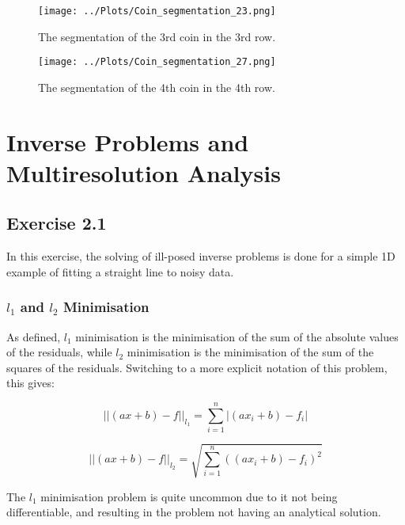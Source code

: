 \documentclass[12pt]{report} %
\begin{document}
\begin{figure}[htbp]
    \centering
    \texttt{[image: ../Plots/Coin\_segmentation\_23.png]}
    \caption{The segmentation of the 3rd coin in the 3rd row.}
    \label{fig:coin_23_segmentation}
\end{figure}

\begin{figure}[htbp]
    \centering
    \texttt{[image: ../Plots/Coin\_segmentation\_27.png]}
    \caption{The segmentation of the 4th coin in the 4th row.}
    \label{fig:coin_27_segmentation}
\end{figure}

\chapter{Inverse Problems and Multiresolution Analysis}

\section{Exercise 2.1}

In this exercise, the solving of ill-posed inverse problems is done for a simple 1D example of fitting a straight line to noisy data.

\subsection{\texorpdfstring{$l_{1}$ and $l_{2}$ Minimisation}{l1 and l2 Minimisation}}

As defined, $l_{1}$ minimisation is the minimisation of the sum of the absolute values of the residuals\cite{wiki_lad}, while $l_{2}$ minimisation is the minimisation of the sum of the squares of the residuals\cite{margalit2021method}. Switching to a more explicit notation of this problem, this gives:

\begin{equation}
    ||(ax + b) - f||_{l_{1}} = \sum_{i=1}^{n} |(ax_{i} + b) - f_{i}|
\end{equation}

\begin{equation}
    ||(ax + b) - f||_{l_{2}} = \sqrt{\sum_{i=1}^{n} ((ax_{i} + b) - f_{i})^{2}}
\end{equation}

The $l_{1}$ minimisation problem is quite uncommon due to it not being differentiable, and resulting in the problem not having an analytical solution.
\end{document}
